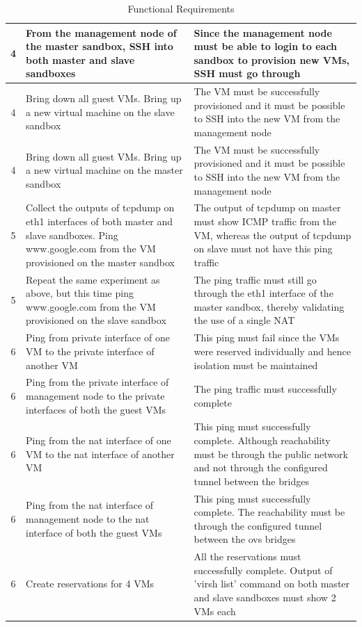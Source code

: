 \documentclass[12pt]{extarticle}
\begin{document}
\begin{center}
     \begin{table}[H]

     \begin{tabular}{||c  | p{0.5\linewidth} | p{0.5\linewidth} ||}
     \hline
     4 & From the management node of the master sandbox, SSH into both master and slave sandboxes & Since the management node must be able to login to each sandbox to provision new VMs, SSH must go through \\
     \hline
     4 & Bring down all guest VMs. Bring up a new virtual machine on the slave sandbox & The VM must be successfully provisioned and it must be possible to SSH into the new VM from the management node \\
     \hline
     4 & Bring down all guest VMs. Bring up a new virtual machine on the master sandbox & The VM must be successfully provisioned and it must be possible to SSH into the new VM from the management node \\
     \hline
     5 & Collect the outputs of tcpdump on eth1 interfaces of both master and slave sandboxes. Ping www.google.com from the VM provisioned on the master sandbox & The output of tcpdump on master must show ICMP traffic from the VM, whereas the output of tcpdump on slave must not have this ping traffic \\
     \hline
    5 & Repeat the same experiment as above, but this time ping www.google.com from the VM provisioned on the slave sandbox & The ping traffic must still go through the eth1 interface of the master sandbox, thereby validating the use of a single NAT \\
     \hline
    6 & Ping from private interface of one VM to the private interface of another VM & This ping must fail since the VMs were reserved individually and hence isolation must be maintained\\
    \hline
    6 & Ping from the private interface of management node to the private interfaces of both the guest VMs & The ping traffic must successfully complete \\
    \hline
    6 & Ping from the nat interface of one VM to the nat interface of another VM & This ping must successfully complete. Although reachability must be through the public network and not through the configured tunnel between the bridges \\
    \hline
    6 & Ping from the nat interface of management node to the nat interface of both the guest VMs & This ping must successfully complete. The reachability must be through the configured tunnel between the ovs bridges \\
    \hline
    6 & Create reservations for 4 VMs & All the reservations must successfully complete. Output of 'virsh list' command on both master and slave sandboxes must show 2 VMs each \\
    \hline
\end{tabular}
\caption{Functional Requirements}
\label{table:func_vv}
\end{table}
\end{center}
\end{document}
